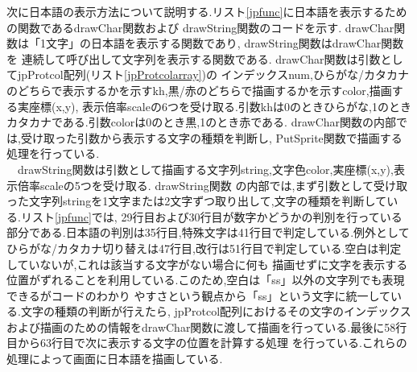\documentclass[a4j]{jarticle}
\begin{document}
    次に日本語の表示方法について説明する.リスト\ref{jpfunc}に日本語を表示するための関数であるdrawChar関数および
    drawString関数のコードを示す. drawChar関数は「1文字」の日本語を表示する関数であり, drawString関数はdrawChar関数を
    連続して呼び出して文字列を表示する関数である. drawChar関数は引数としてjpProtcol配列(リスト\ref{jpProtcolarray})の
    インデックスnum,ひらがな/カタカナのどちらで表示するかを示すkh,黒/赤のどちらで描画するかを示すcolor,描画する実座標(x,y),
    表示倍率scaleの6つを受け取る.引数khは0のときひらがな,1のときカタカナである.引数colorは0のとき黒,1のとき赤である.
    drawChar関数の内部では,受け取った引数から表示する文字の種類を判断し, PutSprite関数で描画する処理を行っている.\\
    　drawString関数は引数として描画する文字列string,文字色color,実座標(x,y),表示倍率scaleの5つを受け取る. drawString関数
    の内部では,まず引数として受け取った文字列stringを1文字または2文字ずつ取り出して,文字の種類を判断している.リスト\ref{jpfunc}では,
    29行目および30行目が数字かどうかの判別を行っている部分である.日本語の判別は35行目,特殊文字は41行目で判定している.例外として
    ひらがな/カタカナ切り替えは47行目,改行は51行目で判定している.空白は判定していないが,これは該当する文字がない場合に何も
    描画せずに文字を表示する位置がずれることを利用している.このため,空白は「ss」以外の文字列でも表現できるがコードのわかり
    やすさという観点から「ss」という文字に統一している.文字の種類の判断が行えたら, jpProtcol配列におけるその文字のインデックス
    および描画のための情報をdrawChar関数に渡して描画を行っている.最後に58行目から63行目で次に表示する文字の位置を計算する処理
    を行っている.これらの処理によって画面に日本語を描画している.
\end{document}
